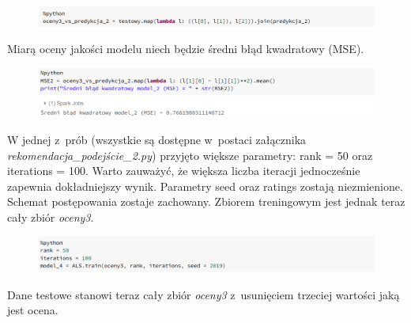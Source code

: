 \documentclass[12pt,a4paper]{report}
\begin{document}
\begin{figure}[H]
\includegraphics[scale=0.5]{obrazy/ALS11.PNG} 
\end{figure}

Miarą oceny jakości modelu niech będzie średni błąd kwadratowy (MSE).

\begin{figure}[H]
\includegraphics[scale=0.5]{obrazy/ALS12.PNG} 
\end{figure}

W jednej z~prób (wszystkie są dostępne w~postaci załącznika \textit{rekomendacja\_podejście\_2.py}) przyjęto większe parametry: rank = 50 oraz iterations = 100. Warto zauważyć, że większa liczba iteracji jednocześnie zapewnia dokładniejszy wynik. Parametry seed oraz ratings zostają niezmienione. Schemat postępowania zostaje zachowany. Zbiorem treningowym jest jednak teraz cały zbiór \textit{oceny3}.

\begin{figure}[H]
\includegraphics[scale=0.5]{obrazy/ALS13.PNG} 
\end{figure}

Dane testowe stanowi teraz cały zbiór \textit{oceny3} z~usunięciem trzeciej wartości jaką jest ocena.
\end{document}
